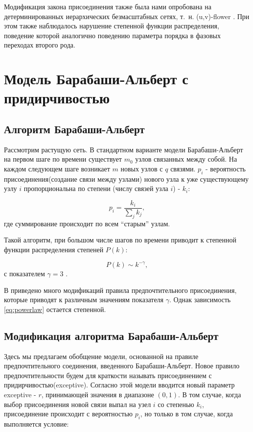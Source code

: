 \documentclass[10pt,aps,pra]{revtex4-1}
\begin{document}
    Модификация закона присоединения также была нами опробована на детерминированных иерархических безмасштабных сетях, т. н. (u,v)-flower \cite{Dor1}. При этом также наблюдалось нарушение степенной функции распределения, поведение которой аналогично поведению параметра порядка в фазовых переходах второго рода.

\section{Модель Барабаши-Альберт с придирчивостью}

    \subsection{Алгоритм Барабаши-Альберт}

        Рассмотрим растущую сеть. В стандартном варианте модели Барабаши-Альберт \cite{AlBa1} на первом шаге по времени существует $m_0$ узлов связанных между собой. На каждом следующем шаге возникает $m$ новых узлов с $q$ связями. $p_i$ - вероятность присоединения(создание связи между узлами) нового узла к уже существующему узлу $i$ пропорциональна по степени (числу связей узла $i$) - $k_i$:

            \begin{equation}
                p_i = \frac{k_i}{\sum\limits_{j} k_j},
            \end{equation}
                где суммирование происходит по всем “старым” узлам.

        Такой алгоритм, при большом числе шагов по времени приводит к степенной функции распределения степеней $P(k)$:

            \begin{equation}\label{eq:powerlaw}
                P(k) \sim k^{-\gamma},
            \end{equation}
                с показателем $\gamma =3$ \cite{AlBa1}.

        В \cite{AlBa2} приведено много модификаций правила предпочтительного присоединения, которые приводят к различным значениям показателя $\gamma$. Однак зависимость \eqref{eq:powerlaw} остается степенной.

    \subsection{Модификация алгоритма Барабаши-Альберт}

        Здесь мы предлагаем обобщение модели, основанной на правиле предпочтительного соединения, введенного Барабаши-Альберт. Новое правило предпочтительности будем для краткости называть присоединением с придирчивостью(exceptive). Согласно этой модели вводится новый параметр exceptive - $r$, принимающей значения в диапазоне $(0, 1)$. В том случае, когда выбор присоединения новой связи выпал на узел $i$ со степенью $k_i$, присоединение происходит с вероятностью $p_i$, но только в том случае, когда выполняется условие:
\end{document}
